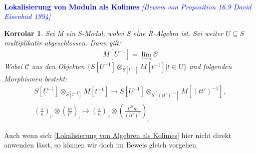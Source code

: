 \documentclass[10pt,a4paper]{report}
\newcommand{\comment}[1]{}
\newcommand{\ModulsOfDifferenzials}{David Eisenbud 1994}
\newcounter{Aussage}[chapter]
\newtheorem{korrolar}[Aussage]{Korrolar}
\newcommand{\Tensor}[3]{#1 \otimes_{#2} #3}
\newcommand{\tensor}[3]{#1 \otimes #3}
\newcommand{\lok}[2]{#1 [#2^{-1}]}
\newcommand{\loke}[3]{(\frac{#1}{#2})_{_{#3}}}
\newcommand{\colimes}[0]{\lim\limits_{ \longrightarrow }}
\begin{document}
\ \\
\textcolor{blue}{\textbf{Lokalisierung von Moduln als Kolimes} \textit{[Beweis von Proposition 16.9 \ModulsOfDifferenzials]}}
\begin{korrolar}\comment{\label{Lokalisierung von Moduln als Kolimes}}
Sei M ein S-Modul, wobei S eine R-Algebra ist. Sei weiter $U \subseteq S$ multiplikativ abgeschlossen. Dann gilt:
\begin{gather*}
\lok{M}{U} = \colimes \mathcal{C}
\end{gather*}
Wobei $\mathcal{C}$ aus den Objekten $\lbrace \Tensor{\lok{S}{U}}{\lok{S}{t}}{\lok{M}{t}} \vert t \in U \rbrace$ und folgenden Morphismen besteht:
\begin{gather*}
\Tensor{\lok{S}{U}}{\lok{S}{t}}{\lok{M}{t}} \longrightarrow
\Tensor{\lok{S}{U}}{\lok{S}{(tt')}}{\lok{M}{(tt')}} ,\\
\tensor{\loke{s}{u}{U}}{\lok{S}{t}}{\loke{m}{t^n}{t}} \longmapsto
\tensor{\loke{s}{u}{U}}{\lok{S}{t}}{\loke{t'^nm}{(tt')^n}{t}} 
\end{gather*}
\end{korrolar}
Auch wenn sich \cref{Lokalisierung von Algebren als Kolimes} hier nicht direkt anwenden lässt, so können wir doch im Beweis gleich vorgehen.
\end{document}
